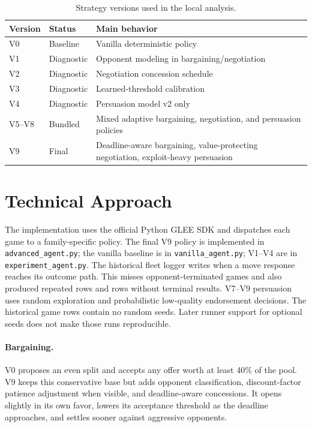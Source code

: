 \documentclass{article}
\begin{document}
\begin{table}[H]
\caption{Strategy versions used in the local analysis.}
\label{tab:versions}
\centering
\small
\begin{tabular}{lll}
\toprule
Version & Status & Main behavior \\
\midrule
V0 & Baseline & Vanilla deterministic policy \\
V1 & Diagnostic & Opponent modeling in bargaining/negotiation \\
V2 & Diagnostic & Negotiation concession schedule \\
V3 & Diagnostic & Learned-threshold calibration \\
V4 & Diagnostic & Persuasion model v2 only \\
V5--V8 & Bundled & Mixed adaptive bargaining, negotiation, and persuasion policies \\
V9 & Final & Deadline-aware bargaining, value-protecting negotiation, exploit-heavy persuasion \\
\bottomrule
\end{tabular}
\end{table}

\section{Technical Approach}

The implementation uses the official Python GLEE SDK and dispatches each game to a family-specific policy. The final V9 policy is implemented in \texttt{advanced\_agent.py}; the vanilla baseline is in \texttt{vanilla\_agent.py}; V1--V4 are in \texttt{experiment\_agent.py}. The historical fleet logger writes when a move response reaches its outcome path. This misses opponent-terminated games and also produced repeated rows and rows without terminal results. V7--V9 persuasion uses random exploration and probabilistic low-quality endorsement decisions. The historical game rows contain no random seeds. Later runner support for optional seeds does not make those runs reproducible.

\paragraph{Bargaining.}
V0 proposes an even split and accepts any offer worth at least 40\% of the pool. V9 keeps this conservative base but adds opponent classification, discount-factor patience adjustment when visible, and deadline-aware concessions. It opens slightly in its own favor, lowers its acceptance threshold as the deadline approaches, and settles sooner against aggressive opponents.
\end{document}
